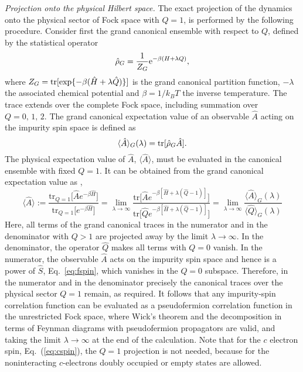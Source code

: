 \documentclass[12pt,twoside]{article}
\newcommand{\Eq}[1]{Eq.~(\ref{#1})}
\begin{document}
\textit{Projection onto the physical Hilbert space.} 
The exact projection of the dynamics onto the physical sector of Fock 
space with $Q=1$, is performed by the following procedure. 
Consider first the grand canonical ensemble with respect to $Q$, 
defined by the statistical operator
\begin{equation}
\hat \rho _G = \frac{1}{Z_G} {\rm e}^{-\beta (H+\lambda Q)},
\label{eq:stat_op}
\end{equation}
where $Z_G={\rm tr}[{\rm exp}\{-\beta (\hat H+\lambda \hat Q)\}]$ 
is the grand canonical partition function, $-\lambda$ 
the associated chemical potential and $\beta=1/k_BT$ 
the inverse temperature. The trace extends over the complete Fock space,
including summation over $Q=0,\,1,\,2$. The grand canonical expectation 
value of an observable $\hat A$ acting on the impurity spin space is 
defined as
\begin{equation}
\langle \hat A\rangle _G (\lambda)= {\rm tr} [\hat \rho _G \hat A] .
\label{eq:exp_val}
\end{equation}
The physical expectation value of $\hat A$, $\langle \hat A\rangle$, 
must be evaluated in the canonical ensemble with fixed $Q=1$. It can be
obtained from the grand canonical expectation value as 
\cite{Abrikosov65},
\begin{equation}
\langle \hat A\rangle :=
\frac { \mbox{tr}_{Q=1}\bigl[\hat A e^{-\beta \hat H} \bigr]} 
      { \mbox{tr}_{Q=1}\bigl[e^{-\beta \hat H} \bigr]} =
\lim _{\lambda \rightarrow \infty}
\frac { \mbox{tr}\bigl[\hat A e^{-\beta [\hat H+\lambda (\hat Q-1)]} \bigr]} 
      { \mbox{tr}\bigl[ \hat{Q} e^{-\beta [\hat H+\lambda (\hat Q-1)]} \bigr]} =
\lim _{\lambda \rightarrow \infty} 
\frac {\langle \hat A \rangle _{G}(\lambda )}{\langle \hat Q \rangle _{G}(\lambda )}
\label{eq:projection}  
\end{equation}
Here, all terms of the grand canonical traces in the numerator and in the 
denominator with $Q>1$ are projected away by the limit $\lambda\to\infty$. 
In the denominator, the operator $\hat{Q}$ makes all terms with $Q=0$ vanish.
In the numerator, the observable $\hat{A}$ acts on the impurity spin 
space and hence is a power of $\hat{S}$, Eq.~\ref{eq:fspin}, which 
vanishes in the $Q=0$ subspace. Therefore, in the numerator and in the 
denominator precisely the canonical traces over the physical sector $Q=1$
remain, as required. It follows that any impurity-spin correlation function
can be evaluated as a pseudofermion correlation function in the 
unrestricted Fock space, where Wick's theorem and the decomposition in terms 
of Feynman diagrams with pseudofermion propagators are valid, and taking the
limit $\lambda\to\infty$ at the end of the calculation. Note that for the 
$c$ electron spin, \Eq{eq:cspin}, the $Q=1$ projection is not needed,
because for the noninteracting $c$-electrons doubly occupied or empty 
states are allowed. 
\end{document}
